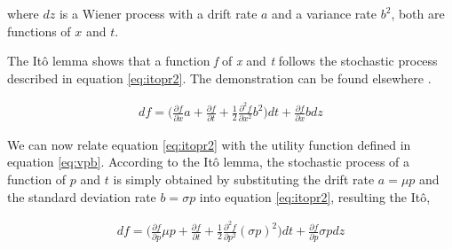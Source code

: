 \documentclass[11pt,twocolumn]{article}
\begin{document}
where $dz$ is a Wiener process with a drift rate $a$ and a variance rate $b^2$, both are functions of $x$ and $t$.

The It\^{o} lemma shows that a function \emph{f} of \emph{x} and \emph{t} follows the stochastic process described in equation \ref{eq:itopr2}. The demonstration can be found elsewhere \citep{shreve_stochastic_2010}.

\begin{equation}
\begin{split}
   df = \bigg(\frac{\partial f}{\partial x} a  + \frac{\partial f}{\partial t} + \frac{1}{2}\frac{\partial ^2 f}{\partial x^2} b^2 \bigg)dt + \frac{\partial f}{\partial x}b dz
\end{split}
\label{eq:itopr2}
\end{equation}

We can now relate equation \ref{eq:itopr2} with the utility function defined in equation \ref{eq:vpb}. According to the It\^{o} lemma, the stochastic process of a function of $p$ and $t$ is simply obtained by substituting the drift rate $a = \mu p$ and the standard deviation rate $b = \sigma p$ into equation \ref{eq:itopr2}, resulting the It\^{o},

\begin{equation}
\begin{split}
   df = \bigg(\frac{\partial f}{\partial p} \mu p  + \frac{\partial f}{\partial t} + \frac{1}{2}\frac{\partial ^2 f}{\partial p^2} (\sigma p)^2 \bigg)dt + \frac{\partial f}{\partial p}\sigma p dz
\end{split}
\label{eq:itopr3}
\end{equation}
\end{document}
